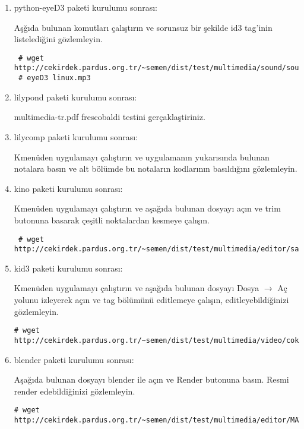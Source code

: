 \documentclass[a4paper,10pt]{article}
\begin{document}
\begin{enumerate}

\item python-eyeD3 paketi kurulumu sonrası:

Aşğıda bulunan komutları çalıştırın ve sorunsuz bir şekilde id3 tag'inin listelediğini gözlemleyin.
\begin{verbatim}
 # wget http://cekirdek.pardus.org.tr/~semen/dist/test/multimedia/sound/sound/sample.mp3
 # eyeD3 linux.mp3 
\end{verbatim}

\item lilypond paketi kurulumu sonrası:

  multimedia-tr.pdf frescobaldi testini gerçaklaştiriniz.

\item lilycomp paketi kurulumu sonrası:
   
 Kmenüden uygulamayı çalıştırın ve uygulamanın yukarısında bulunan notalara basın ve alt bölümde bu notaların kodlarının basıldığını gözlemleyin.

\item kino paketi kurulumu sonrası:

  Kmenüden uygulamayı çalıştırın ve aşağıda bulunan dosyayı açın ve trim butonuna basarak çeşitli noktalardan kesmeye çalışın.
\begin{verbatim}
 # wget http://cekirdek.pardus.org.tr/~semen/dist/test/multimedia/editor/sample.dv
\end{verbatim}


\item kid3 paketi kurulumu sonrası:

Kmenüden uygulamayı çalıştırın ve aşağıda bulunan dosyayı Dosya $\rightarrow$ Aç yolunu izleyerek açın ve tag bölümünü editlemeye çalışın, editleyebildiğinizi gözlemleyin.

\begin{verbatim}
# wget http://cekirdek.pardus.org.tr/~semen/dist/test/multimedia/video/cokluortam/linux.mp3 
\end{verbatim}

 \item blender paketi kurulumu sonrası:

Aşağıda bulunan dosyayı blender ile açın ve Render butonuna basın. Resmi render edebildiğinizi gözlemleyin.
\begin{verbatim}
# wget http://cekirdek.pardus.org.tr/~semen/dist/test/multimedia/editor/MATtests1.blend 
\end{verbatim}


\end{enumerate}
\end{document}
